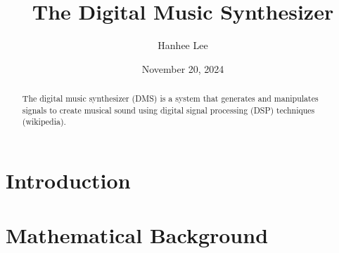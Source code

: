 \documentclass[12pt]{article}
\title{\textbf{The Digital Music Synthesizer}}
\author{Hanhee Lee}
\date{November 20, 2024}
\begin{document}
\maketitle
\begin{abstract}
The digital music synthesizer (DMS) is a system that generates and manipulates signals to create musical sound using digital signal processing (DSP) techniques (wikipedia).
\end{abstract} 

\section{Introduction}

\section{Mathematical Background}
\end{document}
